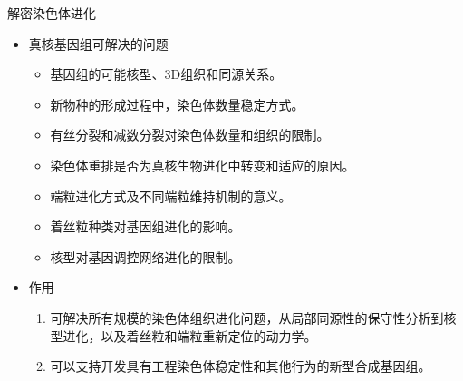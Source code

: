 \documentclass{beamer}
\begin{document}

	\begin{frame}{解密染色体进化}
		\begin{itemize}
			\item 真核基因组可解决的问题
			\begin{itemize}
				\item 基因组的可能核型、3D组织和同源关系。
				\item 新物种的形成过程中，染色体数量稳定方式。
				\item 有丝分裂和减数分裂对染色体数量和组织的限制。
				\item 染色体重排是否为真核生物进化中转变和适应的原因。
				\item 端粒进化方式及不同端粒维持机制的意义。
				\item 着丝粒种类对基因组进化的影响。
				\item 核型对基因调控网络进化的限制。
			\end{itemize}

			\item 作用
			\begin{enumerate}
				\item 可解决所有规模的染色体组织进化问题，从局部同源性的保守性分析到核型进化，以及着丝粒和端粒重新定位的动力学。
				\item 可以支持开发具有工程染色体稳定性和其他行为的新型合成基因组。
			\end{enumerate}
		\end{itemize}
	\end{frame}

\end{document}
